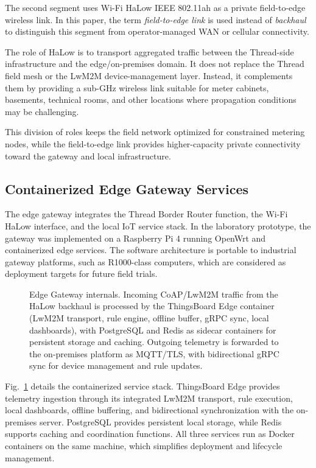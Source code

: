 \documentclass[conference]{IEEEtran}
\begin{document}
The second segment uses Wi-Fi HaLow IEEE 802.11ah as a private field-to-edge wireless link. In this paper, the term \emph{field-to-edge link} is used instead of \emph{backhaul} to distinguish this segment from operator-managed WAN or cellular connectivity.

The role of HaLow is to transport aggregated traffic between the Thread-side infrastructure and the edge/on-premises domain. It does not replace the Thread field mesh or the LwM2M device-management layer. Instead, it complements them by providing a sub-GHz wireless link suitable for meter cabinets, basements, technical rooms, and other locations where propagation conditions may be challenging.

This division of roles keeps the field network optimized for constrained metering nodes, while the field-to-edge link provides higher-capacity private connectivity toward the gateway and local infrastructure.

\subsection{Containerized Edge Gateway Services}
\label{subsec:edge_gateway_services}

The edge gateway integrates the Thread Border Router function, the Wi-Fi HaLow interface, and the local IoT service stack. In the laboratory prototype, the gateway was implemented on a Raspberry Pi 4 running OpenWrt and containerized edge services. The software architecture is portable to industrial gateway platforms, such as R1000-class computers, which are considered as deployment targets for future field trials.

\begin{figure}[t]
\centering
\resizebox{0.85\columnwidth}{!}{%
    
}
\caption{Edge Gateway internals. Incoming CoAP/LwM2M traffic from the HaLow backhaul is processed by the ThingsBoard Edge container (LwM2M transport, rule engine, offline buffer, gRPC sync, local dashboards), with PostgreSQL and Redis as sidecar containers for persistent storage and caching. Outgoing telemetry is forwarded to the on-premises platform as MQTT/TLS, with bidirectional gRPC sync for device management and rule updates.}
\label{fig:edge_gateway}
\end{figure}

Fig.~\ref{fig:edge_gateway} details the containerized service stack. ThingsBoard Edge provides telemetry ingestion through its integrated LwM2M transport, rule execution, local dashboards, offline buffering, and bidirectional synchronization with the on-premises server. PostgreSQL provides persistent local storage, while Redis supports caching and coordination functions. All three services run as Docker containers on the same machine, which simplifies deployment and lifecycle management.
\end{document}
